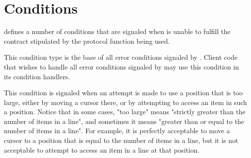 \section{Conditions}

\sysname{} defines a number of conditions that are signaled when
\sysname{} is unable to fulfill the contract stipulated by the
protocol function being used.


This condition type is the base of all error conditions signaled by
\sysname{}.  Client code that wishes to handle all error conditions
signaled by \sysname{} may use this condition in its condition
handlers.


This condition is signaled when an attempt is made to use a
position that is too large, either by moving a cursor there, or by
attempting to access an item in such a position.  Notice that in
some cases, "too large" means "strictly greater than the number of
items in a line", and sometimes it means "greater than or equal to
the number of items in a line".  For example, it is perfectly
acceptable to move a cursor to a position that is equal to the
number of items in a line, but it is not acceptable to attempt to
access an item in a line at that position.
